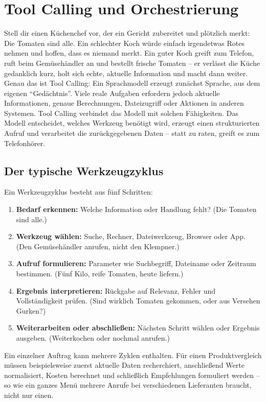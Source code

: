 \chapter{Tool Calling und Orchestrierung}

Stell dir einen Küchenchef vor, der ein Gericht zubereitet und plötzlich merkt: Die Tomaten sind alle. Ein schlechter Koch würde einfach irgendetwas Rotes nehmen und hoffen, dass es niemand merkt. Ein guter Koch greift zum Telefon, ruft beim Gemüsehändler an und bestellt frische Tomaten -- er verlässt die Küche gedanklich kurz, holt sich echte, aktuelle Information und macht dann weiter. Genau das ist Tool Calling: Ein Sprachmodell erzeugt zunächst Sprache, aus dem eigenen ``Gedächtnis''. Viele reale Aufgaben erfordern jedoch aktuelle Informationen, genaue Berechnungen, Dateizugriff oder Aktionen in anderen Systemen. Tool Calling verbindet das Modell mit solchen Fähigkeiten. Das Modell entscheidet, welches Werkzeug benötigt wird, erzeugt einen strukturierten Aufruf und verarbeitet die zurückgegebenen Daten -- statt zu raten, greift es zum Telefonhörer.



\section{Der typische Werkzeugzyklus}

Ein Werkzeugzyklus besteht aus fünf Schritten:

\begin{enumerate}
\item \textbf{Bedarf erkennen:} Welche Information oder Handlung fehlt? (Die Tomaten sind alle.)
\item \textbf{Werkzeug wählen:} Suche, Rechner, Dateiwerkzeug, Browser oder App. (Den Gemüsehändler anrufen, nicht den Klempner.)
\item \textbf{Aufruf formulieren:} Parameter wie Suchbegriff, Dateiname oder Zeitraum bestimmen. (Fünf Kilo, reife Tomaten, heute liefern.)
\item \textbf{Ergebnis interpretieren:} Rückgabe auf Relevanz, Fehler und Vollständigkeit prüfen. (Sind wirklich Tomaten gekommen, oder aus Versehen Gurken?)
\item \textbf{Weiterarbeiten oder abschließen:} Nächsten Schritt wählen oder Ergebnis ausgeben. (Weiterkochen oder nochmal anrufen.)
\end{enumerate}

Ein einzelner Auftrag kann mehrere Zyklen enthalten. Für einen Produktvergleich müssen beispielsweise zuerst aktuelle Daten recherchiert, anschließend Werte normalisiert, Kosten berechnet und schließlich Empfehlungen formuliert werden -- so wie ein ganzes Menü mehrere Anrufe bei verschiedenen Lieferanten braucht, nicht nur einen.

